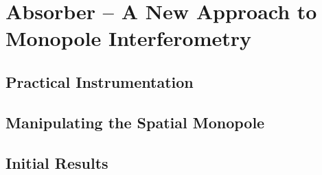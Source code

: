 \chapter{Absorber -- A New Approach to Monopole Interferometry}

\section{Practical Instrumentation}

\section{Manipulating the Spatial Monopole}

\section{Initial Results}

